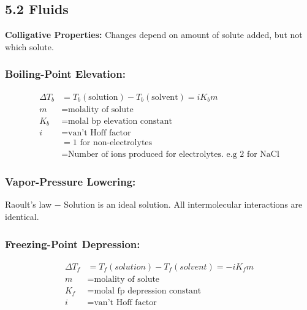 \subsection{5.2 Fluids}
    \textbf{Colligative Properties: }Changes depend on amount of solute added, but not which solute.
    
    \subsubsection{Boiling-Point Elevation: }
        \begin{align*}
            \Delta T_b & = T_b (\textrm{solution}) - T_b (\textrm{solvent}) = iK_b m\\
            m & = \text{molality of solute}\\
            K_b & = \text{molal bp elevation constant}\\
            i & = \text{van't Hoff factor}\\
            & = 1 \text{ for non-electrolytes}\\
            & = \text{Number of ions produced for electrolytes.\ e.g 2 for NaCl}
        \end{align*}
    
    \subsubsection{Vapor-Pressure Lowering: }
    
        Raoult's law $-$ Solution is an ideal solution. All intermolecular interactions are identical. 

    \subsubsection{Freezing-Point Depression: }
        \begin{align*}
            \Delta T_f & = T_f (solution) - T_f (solvent) = -iK_fm\\
            m & = \text{molality of solute}\\
            K_f & = \text{molal fp depression constant}\\
            i & = \text{van't Hoff factor}
        \end{align*}